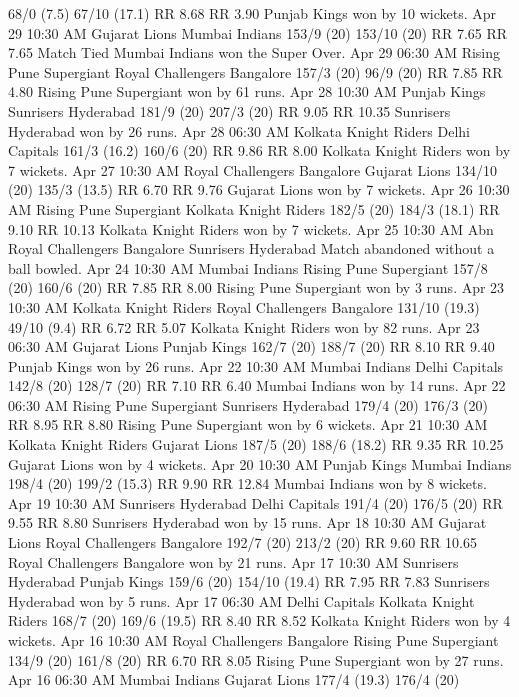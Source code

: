 68/0 (7.5)
67/10 (17.1)
RR 8.68
RR 3.90
Punjab Kings won by 10 wickets.
Apr 29
10:30 AM
Gujarat Lions
Mumbai Indians
153/9 (20)
153/10 (20)
RR 7.65
RR 7.65
Match Tied Mumbai Indians won the Super Over.
Apr 29
06:30 AM
Rising Pune Supergiant
Royal Challengers Bangalore
157/3 (20)
96/9 (20)
RR 7.85
RR 4.80
Rising Pune Supergiant won by 61 runs.
Apr 28
10:30 AM
Punjab Kings
Sunrisers Hyderabad
181/9 (20)
207/3 (20)
RR 9.05
RR 10.35
Sunrisers Hyderabad won by 26 runs.
Apr 28
06:30 AM
Kolkata Knight Riders
Delhi Capitals
161/3 (16.2)
160/6 (20)
RR 9.86
RR 8.00
Kolkata Knight Riders won by 7 wickets.
Apr 27
10:30 AM
Royal Challengers Bangalore
Gujarat Lions
134/10 (20)
135/3 (13.5)
RR 6.70
RR 9.76
Gujarat Lions won by 7 wickets.
Apr 26
10:30 AM
Rising Pune Supergiant
Kolkata Knight Riders
182/5 (20)
184/3 (18.1)
RR 9.10
RR 10.13
Kolkata Knight Riders won by 7 wickets.
Apr 25
10:30 AM
Abn
Royal Challengers Bangalore
Sunrisers Hyderabad
Match abandoned without a ball bowled.
Apr 24
10:30 AM
Mumbai Indians
Rising Pune Supergiant
157/8 (20)
160/6 (20)
RR 7.85
RR 8.00
Rising Pune Supergiant won by 3 runs.
Apr 23
10:30 AM
Kolkata Knight Riders
Royal Challengers Bangalore
131/10 (19.3)
49/10 (9.4)
RR 6.72
RR 5.07
Kolkata Knight Riders won by 82 runs.
Apr 23
06:30 AM
Gujarat Lions
Punjab Kings
162/7 (20)
188/7 (20)
RR 8.10
RR 9.40
Punjab Kings won by 26 runs.
Apr 22
10:30 AM
Mumbai Indians
Delhi Capitals
142/8 (20)
128/7 (20)
RR 7.10
RR 6.40
Mumbai Indians won by 14 runs.
Apr 22
06:30 AM
Rising Pune Supergiant
Sunrisers Hyderabad
179/4 (20)
176/3 (20)
RR 8.95
RR 8.80
Rising Pune Supergiant won by 6 wickets.
Apr 21
10:30 AM
Kolkata Knight Riders
Gujarat Lions
187/5 (20)
188/6 (18.2)
RR 9.35
RR 10.25
Gujarat Lions won by 4 wickets.
Apr 20
10:30 AM
Punjab Kings
Mumbai Indians
198/4 (20)
199/2 (15.3)
RR 9.90
RR 12.84
Mumbai Indians won by 8 wickets.
Apr 19
10:30 AM
Sunrisers Hyderabad
Delhi Capitals
191/4 (20)
176/5 (20)
RR 9.55
RR 8.80
Sunrisers Hyderabad won by 15 runs.
Apr 18
10:30 AM
Gujarat Lions
Royal Challengers Bangalore
192/7 (20)
213/2 (20)
RR 9.60
RR 10.65
Royal Challengers Bangalore won by 21 runs.
Apr 17
10:30 AM
Sunrisers Hyderabad
Punjab Kings
159/6 (20)
154/10 (19.4)
RR 7.95
RR 7.83
Sunrisers Hyderabad won by 5 runs.
Apr 17
06:30 AM
Delhi Capitals
Kolkata Knight Riders
168/7 (20)
169/6 (19.5)
RR 8.40
RR 8.52
Kolkata Knight Riders won by 4 wickets.
Apr 16
10:30 AM
Royal Challengers Bangalore
Rising Pune Supergiant
134/9 (20)
161/8 (20)
RR 6.70
RR 8.05
Rising Pune Supergiant won by 27 runs.
Apr 16
06:30 AM
Mumbai Indians
Gujarat Lions
177/4 (19.3)
176/4 (20)
